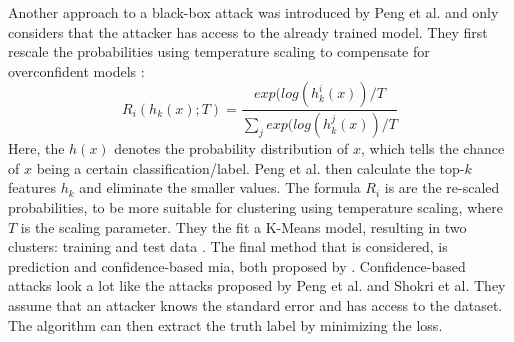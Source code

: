 Another approach to a black-box attack was introduced by Peng et al. and only considers that the attacker has access to the already trained model.
They first rescale the probabilities using temperature scaling to compensate for overconfident models \citep{peng_unsupervised_nodate}:
\begin{equation}
    R_i(h_k(x);T) = \frac{exp(log(h^i_k(x))/T}{\sum_j{exp(log(h^j_k(x))/T}}
\end{equation}
Here, the $h(x)$ denotes the probability distribution of $x$, which tells the chance of $x$ being a certain classification/label. Peng et al. then calculate the top-$k$ features $h_k$ and eliminate the smaller values. 
The formula $R_i$ is are the re-scaled probabilities,  to be more suitable for clustering using temperature scaling, where $T$ is the scaling parameter.  They the fit a K-Means model, resulting in two clusters: training and test data \citep{peng_unsupervised_nodate}.
\newpage
The final method that is considered, is prediction and confidence-based \gls{mia}, both proposed by \citep{yeom_privacy_2018}. Confidence-based attacks look a lot like the attacks proposed by Peng et al. and Shokri et al.
They assume that an attacker knows the standard error and has access to the dataset.
The algorithm can then extract the truth label by minimizing the loss. \newline






